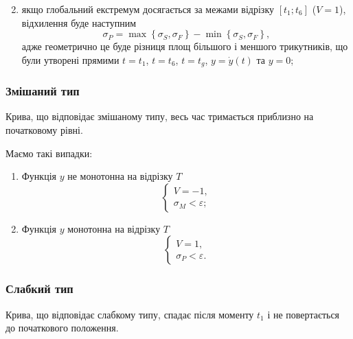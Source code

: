 \begin{enumerate}
\begin{equation*}
    \end{equation*}
  \item
    якщо глобальний екстремум досягається за межами відрізку
    $\left[ t_1; t_6 \right]$ ($V=1$), відхилення буде наступним
    \begin{equation*}
      \sigma_P %
      = \max{\left\{ \sigma_S, \sigma_F \right\}}
        - \min{\left\{ \sigma_S, \sigma_F \right\}},
    \end{equation*}
    адже геометрично це буде різниця площ більшого і меншого трикутників,
    що були утворені прямими
    $t=t_1$, $t=t_6$, $t=t_g$, $y=\dot{y}\left( t \right)$ та $y=0$;
\end{enumerate}


\subsubsection{Змішаний тип}
Крива, що відповідає змішаному типу, весь час тримається приблизно на
початковому рівні.

Маємо такі випадки:
\begin{enumerate}
  \item
    Функція $y$ не монотонна на відрізку $T$
    \begin{equation*}
      \begin{cases}
        V = -1, \\
        \sigma_M < \varepsilon;
      \end{cases}
    \end{equation*}
  \item
    Функція $y$ монотонна на відрізку $T$
    \begin{equation*}
      \begin{cases}
        V = 1, \\
        \sigma_P < \varepsilon.
      \end{cases}
    \end{equation*}
\end{enumerate}

\subsubsection{Слабкий тип}
Крива, що відповідає слабкому типу, спадає після моменту $t_1$
і не повертається до початкового положення.

